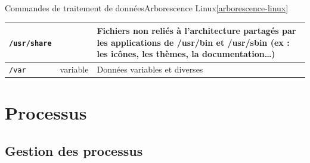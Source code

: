 \documentclass{beamer}
\begin{document}
\begin{frame}{Commandes de traitement de données}{Arborescence Linux\cref{arborescence-linux}}
\begin{tiny}
\begin{table}[h!]
\begin{tabular}{|l|p{3cm}|p{6cm}|}
                    \hline
                    \lstinline{/usr/share} &                         & Fichiers non reliés à l'architecture partagés par les applications de /usr/bin et /usr/sbin (ex : les icônes, les thèmes, la documentation…)                                         \\
                    \hline
                    \lstinline{/var}       & variable                & Données variables et diverses                                                                                                                                                        \\
                    \hline
                \end{tabular}
            \end{table}
        \end{tiny}
    \end{frame}


    \section{Processus}\label{sec:processus}

    \subsection{Gestion des processus}\label{subsec:process-management}
\end{document}
